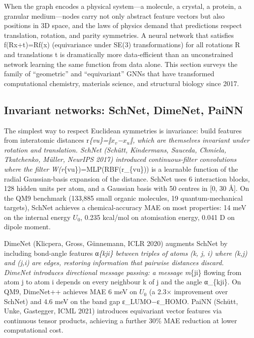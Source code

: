 When the graph encodes a physical system---a molecule, a crystal, a protein, a granular medium---nodes carry not only abstract feature vectors but also positions in 3D space, and the laws of physics demand that predictions respect translation, rotation, and parity symmetries. A neural network that satisfies f(Rx+t)=Rf(x) (equivariance under SE(3) transformations) for all rotations R and translations t is dramatically more data-efficient than an unconstrained network learning the same function from data alone. This section surveys the family of ``geometric'' and ``equivariant'' GNNs that have transformed computational chemistry, materials science, and structural biology since 2017.

\subsection{Invariant networks: SchNet, DimeNet, PaiNN}\label{invariant-networks-schnet-dimenet-painn}

The simplest way to respect Euclidean symmetries is invariance: build features from interatomic distances r\emph{\{vu\}=‖\(x_v\)−\(x_u\)‖, which are themselves invariant under rotation and translation. SchNet (Schütt, Kindermans, Sauceda, Chmiela, Tkatchenko, Müller, NeurIPS 2017) introduced continuous-filter convolutions where the filter W(r}\{vu\})=MLP(RBF(r\_\{vu\})) is a learnable function of the radial Gaussian-basis expansion of the distance. SchNet uses 6 interaction blocks, 128 hidden units per atom, and a Gaussian basis with 50 centres in {[}0, 30 Å{]}. On the QM9 benchmark (133,885 small organic molecules, 19 quantum-mechanical targets), SchNet achieves a chemical-accuracy MAE on most properties: 14 meV on the internal energy \(U_0\), 0.235 kcal/mol on atomisation energy, 0.041 D on dipole moment.

DimeNet (Klicpera, Gross, Günnemann, ICLR 2020) augments SchNet by including bond-angle features α\emph{\{kji\} between triples of atoms (k, j, i) where (k,j) and (j,i) are edges, restoring information that pairwise distances discard. DimeNet introduces directional message passing: a message m}\{ji\} flowing from atom j to atom i depends on every neighbour k of j and the angle α\_\{kji\}. On QM9, DimeNet++ achieves MAE 6 meV on \(U_0\) (a 2.3× improvement over SchNet) and 4.6 meV on the band gap ε\_LUMO−ε\_HOMO. PaiNN (Schütt, Unke, Gastegger, ICML 2021) introduces equivariant vector features via continuous tensor products, achieving a further 30\% MAE reduction at lower computational cost.

